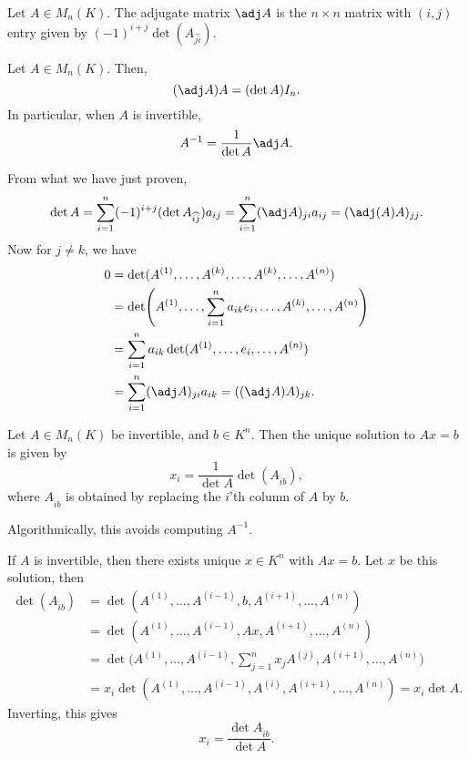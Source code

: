\documentclass[12pt]{article}
\begin{document}
\begin{definition}
	Let $A \in M_n(K)$. The adjugate matrix $\adj A$ is the $n \times n$ matrix with $(i, j)$ entry given by $(-1)^{i+j}\det(A_{\widehat{ji}})$.
\end{definition}

\begin{theorem}
	Let $A \in M_n(K)$. Then,
	\[
		(\adj A) A = (\det A)I_n
	.\]
	In particular, when $A$ is invertible,
	\[
	A^{-1} = \frac{1}{\det A} \adj A
	.\]
\end{theorem}

\begin{proofbox}
	From what we have just proven,
	\[
		\det A = \sum_{i = 1}^{n} (-1)^{i+j}(\det A_{\widehat{ij}})a_{ij} = \sum_{i = 1}^{n}(\adj A)_{ji} a_{ij} = (\adj (A) A)_{jj}
	.\]
	Now for $j \neq k$, we have
	\begin{align*}
		0 &= \det(A^{(1)}, \ldots, A^{(k)}, \ldots, A^{(k)}, \ldots, A^{(n)}) \\
		  &= \det\Biggl(A^{(1)}, \ldots, \sum_{i = 1}^{n}a_{ik} e_i, \ldots, A^{(k)}, \ldots, A^{(n)} \Biggr) \\
		  &= \sum_{i = 1}^{n} a_{ik} \det (A^{(1)}, \ldots, e_i, \ldots, A^{(n)}) \\
		  &= \sum_{i = 1}^{n} (\adj A)_{ji} a_{ik} = ((\adj A)A)_{jk}.
	\end{align*}
\end{proofbox}

\begin{proposition}
	Let $A \in M_n(K)$ be invertible, and $b \in K^{n}$. Then the unique solution to $Ax = b$ is given by
	\[
		x_i = \frac{1}{\det A} \det(A_{\hat i b})
	,\]
	where $A_{\hat i b}$ is obtained by replacing the $i$'th column of $A$ by $b$.
\end{proposition}

Algorithmically, this avoids computing $A^{-1}$.

\begin{proofbox}
	If $A$ is invertible, then there exists unique $x \in K^{n}$ with $Ax = b$. Let $x$ be this solution, then
	\begin{align*}
		\det(A_{\hat i b}) &= \det(A^{(1)}, \ldots, A^{(i-1)}, b, A^{(i+1)}, \ldots, A^{(n)}) \\
				   &= \det (A^{(1)}, \ldots, A^{(i-1)}, Ax, A^{(i+1)}, \ldots, A^{(n)}) \\
				   &= \det \Biggl(A^{(1)}, \ldots, A^{(i-1)}, \sum_{j = 1}^{n} x_j A^{(j)}, A^{(i+1)}, \ldots, A^{(n)} \Biggr) \\
				   &= x_i \det (A^{(1)}, \ldots, A^{(i-1)}, A^{(i)}, A^{(i+1)}, \ldots, A^{(n)}) = x_i \det A.
	\end{align*}
	Inverting, this gives
	\[
	x_i = \frac{\det A_{\hat i b}}{\det A}
	.\]
\end{proofbox}
\end{document}
